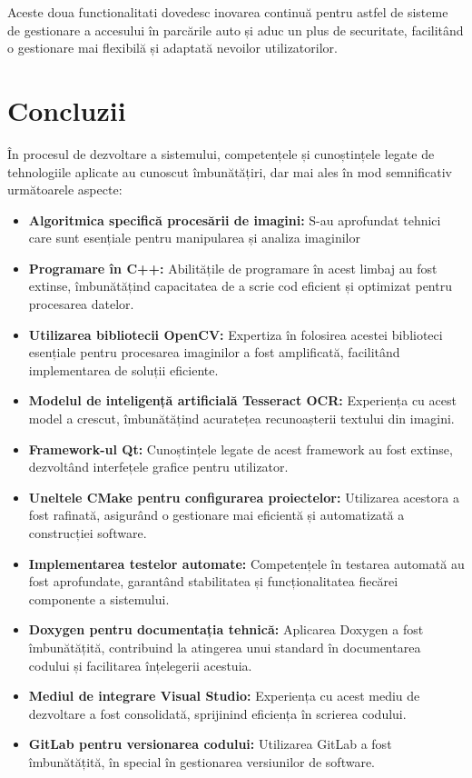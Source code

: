\documentclass[a4paper,12pt]{report}
\begin{document}
Aceste doua functionalitati dovedesc inovarea continuă pentru astfel de sisteme de gestionare a accesului în parcările auto și aduc un plus de securitate, facilitând o gestionare mai flexibilă și adaptată nevoilor utilizatorilor.

\section{Concluzii}
În procesul de dezvoltare a sistemului, competențele și cunoștințele legate de tehnologiile aplicate au cunoscut îmbunătățiri, dar mai ales în mod semnificativ următoarele aspecte:

\begin{itemize}
    \item \textbf{Algoritmica specifică procesării de imagini:} S-au aprofundat tehnici care sunt esențiale pentru manipularea și analiza imaginilor
    \item \textbf{Programare în C++:} Abilitățile de programare în acest limbaj au fost extinse, îmbunătățind capacitatea de a scrie cod eficient și optimizat pentru procesarea datelor.
    \item \textbf{Utilizarea bibliotecii OpenCV:} Expertiza în folosirea acestei biblioteci esențiale pentru procesarea imaginilor a fost amplificată, facilitând implementarea de soluții eficiente.
    \item \textbf{Modelul de inteligență artificială Tesseract OCR:} Experiența cu acest model a crescut, îmbunătățind acuratețea recunoașterii textului din imagini.
    \item \textbf{Framework-ul Qt:} Cunoștințele legate de acest framework au fost extinse, dezvoltând interfețele grafice pentru utilizator.
    \item \textbf{Uneltele CMake pentru configurarea proiectelor:} Utilizarea acestora a fost rafinată, asigurând o gestionare mai eficientă și automatizată a construcției software.
    \item \textbf{Implementarea testelor automate:} Competențele în testarea automată au fost aprofundate, garantând stabilitatea și funcționalitatea fiecărei componente a sistemului.
    \item \textbf{Doxygen pentru documentația tehnică:} Aplicarea Doxygen a fost îmbunătățită, contribuind la atingerea unui standard în documentarea codului și facilitarea înțelegerii acestuia.
    \item \textbf{Mediul de integrare Visual Studio:} Experiența cu acest mediu de dezvoltare a fost consolidată, sprijinind eficiența în scrierea codului.
    \item \textbf{GitLab pentru versionarea codului:} Utilizarea GitLab a fost îmbunătățită, în special în gestionarea versiunilor de software.
\end{itemize}
\end{document}
